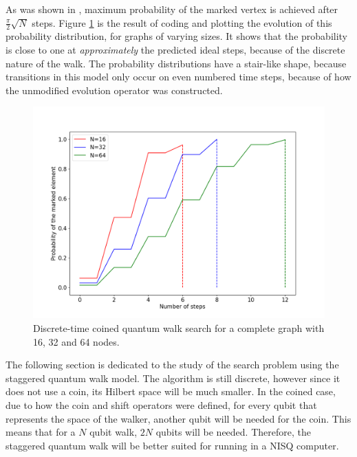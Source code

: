 \documentclass[../../dissertation.tex]{subfiles}
\begin{document}
As was shown in \cite{REN1}, maximum probability of the marked vertex is
achieved after $\frac{\pi}{2}\sqrt{N}$ steps. Figure \ref{fig:coinedSearch} is
the result of coding and plotting the evolution of this probability
distribution, for graphs of varying sizes. It shows that the probability is
close to one at \textit{approximately} the predicted ideal steps, because of
the discrete nature of the walk. The probability distributions have a
stair-like shape, because transitions in this model only occur on even numbered
time steps, because of how the unmodified evolution
operator was constructed.
\begin{figure}[!h]
	\centering
	\includegraphics[scale=0.40]{img/CoinedQuantumWalk/Search/CoinedSearch163264.png}
	\caption{Discrete-time coined quantum walk search for a complete graph with 16, 32 and 64 nodes.}\label{fig:coinedSearch}
\end{figure}\par
The following section is dedicated to the study of the search problem using the
staggered quantum walk model. The algorithm is still discrete, however since it
does not use a coin, its Hilbert space will be much smaller. In the coined
case, due to how the coin and shift operators were defined, for every qubit
that represents the space of the walker, another qubit will be needed for the
coin. This means that for a $N$ qubit walk, $2N$ qubits will be needed.
Therefore, the staggered quantum walk will be better suited for running in a
NISQ computer.
\end{document}
